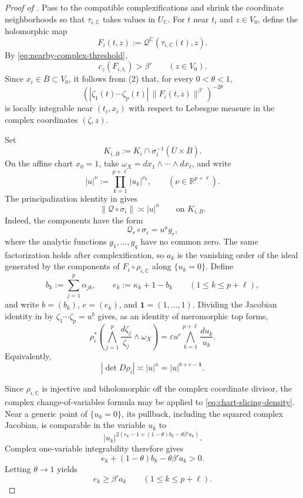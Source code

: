 \documentclass[reqno,11pt]{amsart}
\numberwithin{equation}{section}
\theoremstyle{definition}
\theoremstyle{remark}
\begin{document}
\begin{proof}[Proof of ]
Pass to the compatible complexifications and shrink the coordinate
neighborhoods so that $\tau_{i,\mathbb C}$ takes values in
$U_{\mathbb C}$. For $t$ near $t_i$ and $z\in V_0$, define the
holomorphic map
$$
F_i(t,z)
:=
\mathcal Q^{\mathbb C}(\tau_{i,\mathbb C}(t),z).
$$
By \eqref{eq:nearby-complex-threshold},
$$
c_z(F_{i,t_i})>\beta'
\qquad
(z\in V_0).
$$
Since $x_i\in\overline B\subset V_0$, it follows from
\textnormal{(2)} that, for every
$0<\theta<1$,
\begin{equation}\label{eq:chart-slicing-density}
\left(
|\zeta_1(t) \cdots\zeta_p(t)|\,\|F_i(t,z)\|^{\beta'}
\right)^{-2\theta}
\end{equation}
is locally integrable near $(t_i,x_i)$ with respect to Lebesgue
measure in the complex coordinates $(\zeta,z)$.

Set
$$
K_{i,B}
:=
K_i\cap
\sigma_i^{-1}(\overline U\times\overline B).
$$
On the affine chart $x_0=1$, take
$\omega_X=dx_1\wedge\cdots\wedge dx_\ell$, and write
$$
|u|^\nu:=\prod_{k=1}^{p+\ell}|u_k|^{\nu_k}, \qquad (\nu\in\mathbb R^{p+\ell}).
$$
 The principalization identity in
 gives
\begin{equation}\label{eq:chart-monomial-data}
\|\mathcal Q\circ\sigma_i\|
\asymp
|u|^a
\qquad\text{on }K_{i,B}.
\end{equation}
Indeed, the components have the form
$$
\mathcal Q_r\circ\sigma_i=u^a g_r,
$$
where the analytic functions $g_1,\ldots,g_q$ have no common zero. The same
factorization holds after complexification, so $a_k$ is the vanishing order
of the ideal generated by the components of
$F_i\circ\rho_{i,\mathbb C}$ along $\{u_k=0\}$.
Define
$$
b_k:=\sum_{j=1}^p\alpha_{jk},
\qquad
e_k:=\kappa_k+1-b_k
\qquad
(1\le k\le p+\ell),
$$
and write $b=(b_k)$, $e=(e_k)$, and
$\mathbf 1=(1,\ldots,1)$. Dividing the Jacobian identity in
 by
$
\zeta_1\cdots\zeta_p=u^b
$
gives, as an identity of meromorphic top forms,
\begin{equation}\label{eq:chart-log-jacobian}
\rho_i^*\left(
\bigwedge_{j=1}^p\frac{d\zeta_j}{\zeta_j}\wedge\omega_X
\right)
=
\varepsilon u^e
\bigwedge_{k=1}^{p+\ell}\frac{du_k}{u_k}.
\end{equation}
Equivalently,
\begin{equation}\label{eq:chart-ordinary-jacobian}
|\det D\rho_i|
\asymp
|u|^\kappa
=
|u|^{b+e-\mathbf 1}.
\end{equation}

 Since
$\rho_{i,\mathbb C}$ is injective and biholomorphic off the complex
coordinate divisor, the complex change-of-variables formula may be applied
to \eqref{eq:chart-slicing-density}. Near a generic point of
$\{u_k=0\}$, its pullback, including the squared complex Jacobian, is
comparable in the variable $u_k$ to
$$
|u_k|^{2(e_k-1+(1-\theta)b_k-\theta\beta'a_k)}.
$$
Complex one-variable integrability therefore gives
$$
e_k+(1-\theta)b_k-\theta\beta'a_k>0.
$$
Letting $\theta\to1$ yields
\begin{equation}\label{eq:multiparameter-order-inequality}
e_k\ge\beta'a_k
\qquad
(1\le k\le p+\ell).
\end{equation}


\end{proof}
\end{document}
